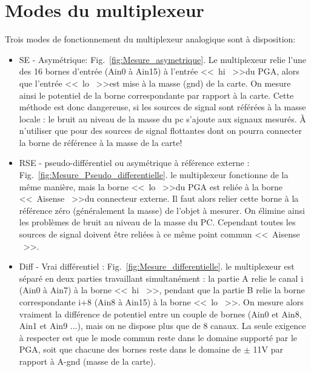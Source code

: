 \documentclass[main.tex]{subfiles}
\begin{document}
\section{Modes du multiplexeur}

Trois modes de fonctionnement du multiplexeur analogique sont à disposition:

\begin{itemize}
    \item SE - Asymétrique: Fig.~\ref{fig:Mesure_asymetrique}. Le multiplexeur relie l'une des 16 bornes d'entrée (Ain0 à Ain15) à l'entrée \textless\textless\ hi \ \textgreater\textgreater du PGA, alors que l'entrée \textless\textless\ lo \ \textgreater\textgreater est mise à la masse (gnd) de la carte. On mesure ainsi le potentiel de la borne correspondante par rapport  à la carte. Cette méthode est donc dangereuse, si les sources de signal sont référées à la masse locale : le bruit au niveau de la masse du pc s'ajoute aux signaux mesurés. À n'utiliser que pour des sources de signal flottantes dont on pourra connecter la borne de référence à la masse de la carte!
    \item RSE - pseudo-différentiel ou asymétrique à référence externe : Fig.~\ref{fig:Mesure_Pseudo_differentielle}. le multiplexeur fonctionne de la même manière, mais la borne \textless\textless\ lo \ \textgreater\textgreater du PGA est reliée à la borne \textless\textless\ Aisense \ \textgreater\textgreater du connecteur externe. Il faut alors relier cette borne à la référence zéro (généralement la masse) de l'objet à mesurer. On élimine ainsi les problèmes de bruit au niveau de la masse du PC. Cependant toutes les sources de signal doivent être reliées à ce même point commun \textless\textless\ Aisense \ \textgreater\textgreater.
    \item Diff - Vrai différentiel : Fig.~\ref{fig:Mesure_differentielle}. le multiplexeur est séparé en deux parties travaillant simultanément : la partie A relie le canal i (Ain0 à Ain7) à la borne \textless\textless\ hi \ \textgreater\textgreater, pendant que la partie B relie la borne correspondante i+8 (Ain8 à Ain15) à la borne \textless\textless\ lo \ \textgreater\textgreater. On mesure alors vraiment la différence de potentiel entre un couple de bornes (Ain0 et Ain8, Ain1 et Ain9 ...), mais on ne dispose plus que de 8 canaux. La seule exigence à respecter est que le mode commun reste dans le domaine supporté par le PGA, soit que chacune des bornes reste dans le domaine de $\pm$ 11V par rapport à A-gnd (masse de la carte).
\end{itemize}
\end{document}
